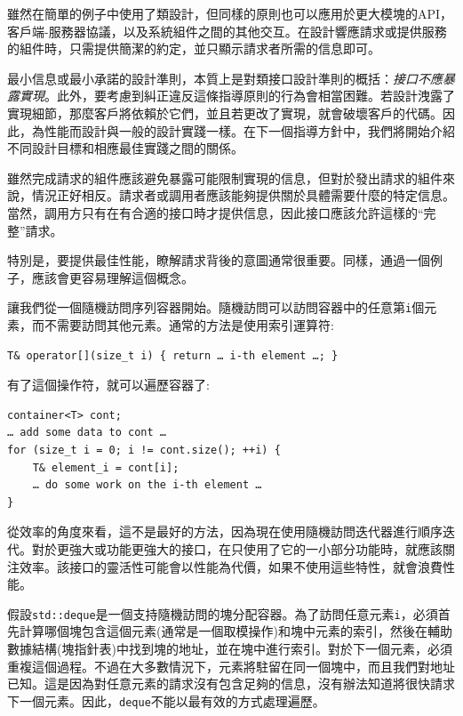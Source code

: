 雖然在簡單的例子中使用了類設計，但同樣的原則也可以應用於更大模塊的API，客戶端-服務器協議，以及系統組件之間的其他交互。在設計響應請求或提供服務的組件時，只需提供簡潔的約定，並只顯示請求者所需的信息即可。

最小信息或最小承諾的設計準則，本質上是對類接口設計準則的概括：\textit{接口不應暴露實現}。此外，要考慮到糾正違反這條指導原則的行為會相當困難。若設計洩露了實現細節，那麼客戶將依賴於它們，並且若更改了實現，就會破壞客戶的代碼。因此，為性能而設計與一般的設計實踐一樣。在下一個指導方針中，我們將開始介紹不同設計目標和相應最佳實踐之間的關係。


雖然完成請求的組件應該避免暴露可能限制實現的信息，但對於發出請求的組件來說，情況正好相反。請求者或調用者應該能夠提供關於具體需要什麼的特定信息。當然，調用方只有在有合適的接口時才提供信息，因此接口應該允許這樣的“完整”請求。

特別是，要提供最佳性能，瞭解請求背後的意圖通常很重要。同樣，通過一個例子，應該會更容易理解這個概念。
 
讓我們從一個隨機訪問序列容器開始。隨機訪問可以訪問容器中的任意第\texttt{i}個元素，而不需要訪問其他元素。通常的方法是使用索引運算符:

\begin{lstlisting}[style=styleCXX]
T& operator[](size_t i) { return … i-th element …; }
\end{lstlisting}

有了這個操作符，就可以遍歷容器了:

\begin{lstlisting}[style=styleCXX]
container<T> cont;
… add some data to cont …
for (size_t i = 0; i != cont.size(); ++i) {
	T& element_i = cont[i];
	… do some work on the i-th element …
}
\end{lstlisting}

從效率的角度來看，這不是最好的方法，因為現在使用隨機訪問迭代器進行順序迭代。對於更強大或功能更強大的接口，在只使用了它的一小部分功能時，就應該關注效率。該接口的靈活性可能會以性能為代價，如果不使用這些特性，就會浪費性能。 

假設\texttt{std::deque}是一個支持隨機訪問的塊分配容器。為了訪問任意元素\texttt{i}，必須首先計算哪個塊包含這個元素(通常是一個取模操作)和塊中元素的索引，然後在輔助數據結構(塊指針表)中找到塊的地址，並在塊中進行索引。對於下一個元素，必須重複這個過程。不過在大多數情況下，元素將駐留在同一個塊中，而且我們對地址已知。這是因為對任意元素的請求沒有包含足夠的信息，沒有辦法知道將很快請求下一個元素。因此，\texttt{deque}不能以最有效的方式處理遍歷。

